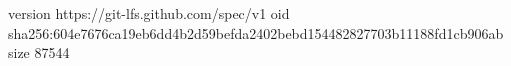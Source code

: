 version https://git-lfs.github.com/spec/v1
oid sha256:604e7676ca19eb6dd4b2d59befda2402bebd154482827703b11188fd1cb906ab
size 87544
